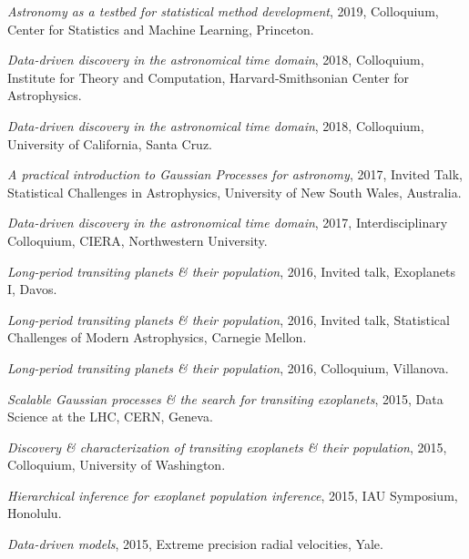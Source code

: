 \documentclass[12pt,letterpaper]{article}
\begin{document}
\begin{list}{}{\cvlist}
  \item \emph{Astronomy as a testbed for statistical method development},
        2019, Colloquium, Center for Statistics and Machine Learning,
        Princeton.

  \item \emph{Data-driven discovery in the astronomical time domain},
        2018, Colloquium, Institute for Theory and Computation,
        Harvard-Smithsonian Center for Astrophysics.

  \item \emph{Data-driven discovery in the astronomical time domain},
        2018, Colloquium, University of California, Santa Cruz.

  \item \emph{A practical introduction to Gaussian Processes for astronomy},
        2017, Invited Talk, Statistical Challenges in Astrophysics,
        University of New South Wales, Australia.

  \item \emph{Data-driven discovery in the astronomical time domain},
        2017, Interdisciplinary Colloquium, CIERA, Northwestern University.

  \item \emph{Long-period transiting planets \& their population},
        2016, Invited talk, Exoplanets I, Davos.

  \item \emph{Long-period transiting planets \& their population},
        2016, Invited talk, Statistical Challenges of Modern Astrophysics,
        Carnegie Mellon.

  \item \emph{Long-period transiting planets \& their population}, 2016,
        Colloquium, Villanova.

  \item \emph{Scalable Gaussian processes \& the search for transiting
          exoplanets}, 2015, Data Science at the LHC, CERN, Geneva.

  \item \emph{Discovery \& characterization of transiting exoplanets \& their
          population}, 2015, Colloquium, University of Washington.

  \item \emph{Hierarchical inference for exoplanet population inference},
        2015, IAU Symposium, Honolulu.

  \item \emph{Data-driven models}, 2015, Extreme precision radial velocities,
        Yale.


\end{list}
\end{document}
